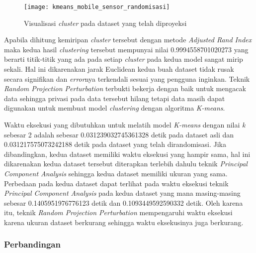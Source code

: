 \begin{figure}
	\centering
	\texttt{[image: kmeans\_mobile\_sensor\_randomisasi]}
	\caption{Visualisasi \textit{cluster} pada dataset yang telah diproyeksi}
	\label{fig:kmeans_mobile_sensor_randomisasi}
\end{figure}

Apabila dihitung kemiripan \textit{cluster} tersebut dengan metode \textit{Adjusted Rand Index} maka kedua hasil \textit{clustering} tersebut mempunyai nilai 0.9994558701020273 yang berarti titik-titik yang ada pada setiap \textit{cluster} pada kedua model sangat mirip sekali. Hal ini dikarenakan jarak Euclidean kedua buah dataset tidak rusak secara signifikan dan \textit{error}nya terkendali sesuai yang pengguna inginkan. Teknik \textit{Random Projection Perturbation} terbukti bekerja dengan baik untuk mengacak data sehingga privasi pada data tersebut hilang tetapi data masih dapat digunakan untuk membuat model \textit{clustering} dengan algoritma \textit{K-means}.

Waktu eksekusi yang dibutuhkan untuk melatih model \textit{K-means} dengan nilai \textit{k} sebesar 2 adalah sebesar 0.031239032745361328 detik pada dataset asli dan 0.031217575073242188 detik pada dataset yang telah dirandomisasi. Jika dibandingkan, kedua dataset memiliki waktu eksekusi yang hampir sama, hal ini dikarenakan kedua dataset tersebut diterapkan terlebih dahulu teknik \textit{Principal Component Analysis} sehingga kedua dataset memiliki ukuran yang sama. Perbedaan pada kedua dataset dapat terlihat pada waktu eksekusi teknik  \textit{Principal Component Analysis} pada kedua dataset yang mana masing-masing sebesar 0.1405951976776123 detik dan 0.1093449592590332 detik. Oleh karena itu, teknik \textit{Random Projection Perturbation} mempengaruhi waktu eksekusi karena ukuran dataset berkurang sehingga waktu eksekusinya juga berkurang.

\subsubsection{Perbandingan}
\label{sec:pengujian-clustering-perbandingan}